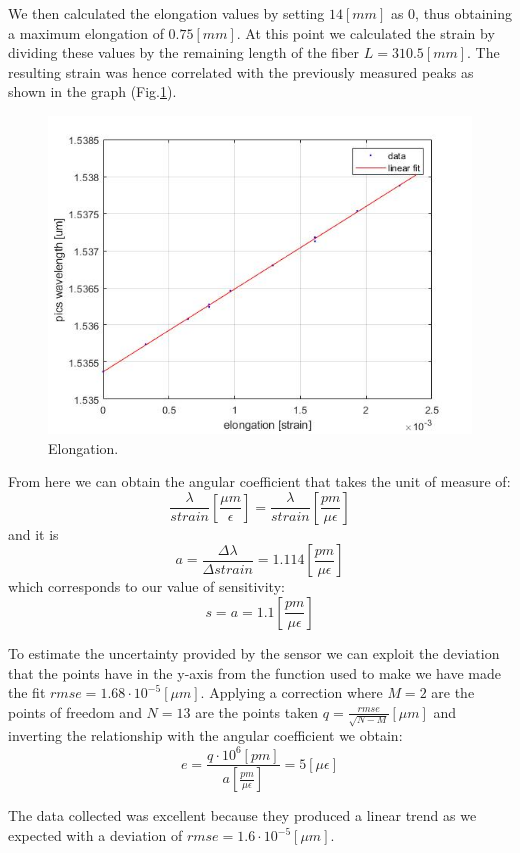 We then calculated the elongation values by setting $14 [mm]$ as 0, thus obtaining a maximum elongation of $0.75 [mm]$. At this point we calculated the strain by dividing these values by the remaining length of the fiber $L = 310.5 [mm]$. The resulting strain  was hence correlated with the previously measured peaks as shown in the graph (Fig.\ref{fig:spins}).
\begin{figure}[h]
    \centering
    \includegraphics[scale=0.7]{img/spins.jpg}
    \caption{Elongation.}
    \label{fig:spins}
\end{figure}
From here we can obtain the angular coefficient that takes the unit of measure of:
$$\frac{\lambda}{strain}\left[\frac{\mu m}{\epsilon}\right] = \frac{\lambda}{strain}\left[\frac{pm}{\mu\epsilon}\right]$$
and it is
$$a = \frac{\Delta \lambda}{ \Delta strain} = 1.114 \left[\frac{pm}{\mu\epsilon}\right]$$
which corresponds to our value of sensitivity:
$$s = a = 1.1 \left[\frac{pm}{\mu\epsilon}\right]$$

To estimate the uncertainty provided by the sensor we can exploit the deviation that the points have in the y-axis from the function used to make we have made the fit $rmse = 1.68\cdot10^{-5} [\mu m]$. Applying a correction where $M = 2$ are the points of freedom and $N = 13$ are the points taken $q = \frac{rmse}{\sqrt{N - M}} [\mu m]$ and inverting the relationship with the angular coefficient we obtain:
$$e = \frac{q \cdot 10^{6} [pm]}{a \left[\frac{pm}{\mu\epsilon}\right]} = 5 [\mu\epsilon]$$

\newpage
{}
The data collected was excellent because they produced a linear trend as we expected with a deviation of $rmse = 1.6 \cdot 10^{-5}[\mu m]$.

